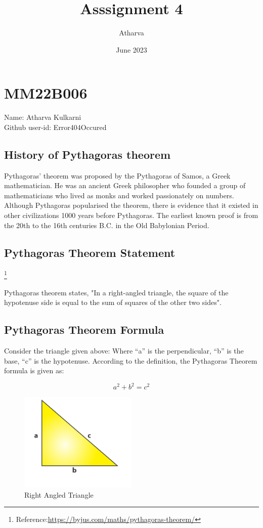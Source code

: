 \documentclass{article}
\title{Asssignment 4}
\author{Atharva}
\date{June 2023}
\begin{document}
\maketitle

\section*{MM22B006}
Name: Atharva Kulkarni\\
Github user-id: Error404Occured

\subsection*{History of Pythagoras theorem}

Pythagoras' theorem was proposed by the Pythagoras of Samos, a Greek mathematician. He was an ancient Greek philosopher who founded a group of mathematicians who lived as monks and worked passionately on numbers. Although Pythagoras popularised the theorem, there is evidence that it existed in other civilizations 1000 years before Pythagoras. The earliest known proof is from the 20th to the 16th centuries B.C. in the Old Babylonian Period.

\subsection*{Pythagoras Theorem Statement}\footnote{Reference:\url{https://byjus.com/maths/pythagoras-theorem/}}

Pythagoras theorem states, "In a right-angled triangle, the square of the hypotenuse side is equal to the sum of squares of the other two sides".

\subsection*{Pythagoras Theorem Formula}


Consider the triangle given above:
Where “a” is the perpendicular,
“b” is the base,
“c” is the hypotenuse.
According to the definition, the Pythagoras Theorem formula is given as:

\begin{equation}
    a^2 + b^2 \boldsymbol{=} c^2
\end{equation}

\begin{figure}[h!t]
    \centering
    \includegraphics[width=0.5\textwidth]{P1.png}
    \caption{Right Angled Triangle}
    \label{fig:my_label1}
\end{figure}
\end{document}
